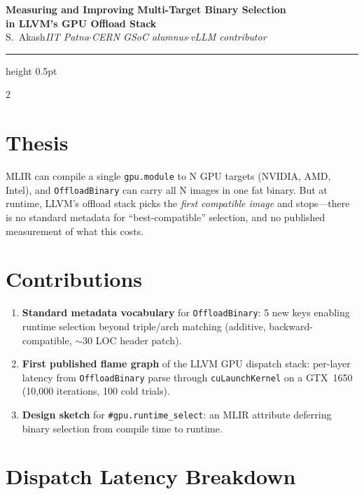 \documentclass[10pt,a4paper]{article}
\begin{document}
\begin{center}
{\large\bfseries Measuring and Improving Multi-Target Binary Selection\\
in LLVM's GPU Offload Stack}\\[3pt]
{\normalsize S.\ Akash\quad \textit{IIT Patna\enspace$\cdot$\enspace CERN GSoC alumnus\enspace$\cdot$\enspace vLLM contributor}}
\end{center}

\vspace{-2pt}
\hrule height 0.5pt
\vspace{4pt}

\begin{multicols}{2}

\section{Thesis}

MLIR can compile a single \texttt{gpu.module} to N GPU targets (NVIDIA, AMD, Intel),
and \texttt{OffloadBinary} can carry all N images in one fat binary.
But at runtime, LLVM's offload stack picks the \emph{first compatible image} and stops---there
is no standard metadata for ``best-compatible'' selection, and no published measurement of
what this costs.

\section{Contributions}

\begin{enumerate}[leftmargin=1.2em,itemsep=1pt,topsep=1pt]
\item \textbf{Standard metadata vocabulary} for \texttt{OffloadBinary}:
  5 new keys enabling runtime selection beyond triple/arch matching
  (additive, backward-compatible, $\sim$30 LOC header patch).
\item \textbf{First published flame graph} of the LLVM GPU dispatch stack:
  per-layer latency from \texttt{OffloadBinary} parse through
  \texttt{cuLaunchKernel} on a GTX~1650 (10{,}000 iterations, 100 cold trials).
\item \textbf{Design sketch} for \texttt{\#gpu.runtime\_select}:
  an MLIR attribute deferring binary selection from compile time to runtime.
\end{enumerate}

\section{Dispatch Latency Breakdown}


\end{multicols}
\end{document}
